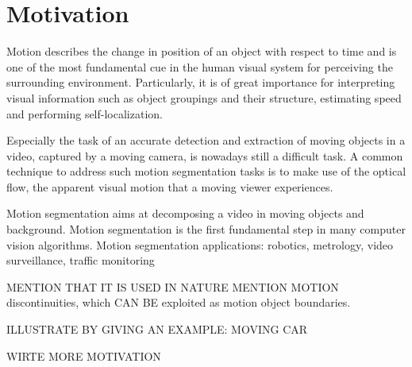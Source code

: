 \section{Motivation}

Motion describes the change in position of an object with respect to time and is one of the most fundamental cue in the human visual system for perceiving the surrounding environment. Particularly, it is of great importance for interpreting visual information such as object groupings and their structure, estimating speed and performing self-localization.

Especially the task of an accurate detection and extraction of moving objects in a video, captured by a moving camera, is nowadays still a difficult task. A common technique to address such motion segmentation tasks is to make use of the optical flow, the apparent visual motion that a moving viewer experiences. 



Motion segmentation aims at decomposing a video in moving objects and background.
Motion segmentation is the first fundamental step in many computer vision algorithms.
Motion segmentation applications: robotics, metrology, video surveillance, traffic monitoring


MENTION THAT IT IS USED IN NATURE
MENTION MOTION discontinuities, which CAN BE exploited as motion object boundaries.


ILLUSTRATE BY GIVING AN EXAMPLE: MOVING CAR

WIRTE MORE MOTIVATION



